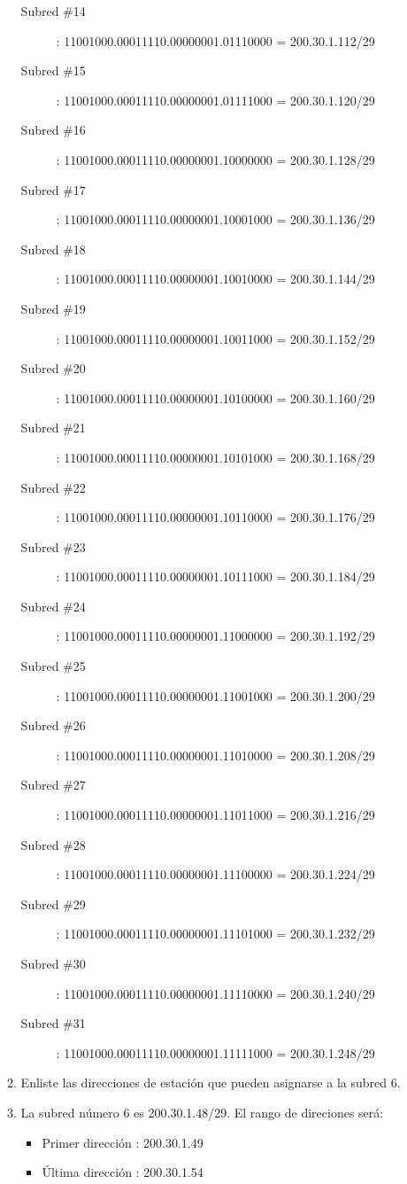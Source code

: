 \begin{enumerate}
\begin{enumerate}
\begin{description}
            \item[Subred \#14] : 11001000.00011110.00000001.01110000 = 200.30.1.112/29
            \item[Subred \#15] : 11001000.00011110.00000001.01111000 = 200.30.1.120/29
            \item[Subred \#16] : 11001000.00011110.00000001.10000000 = 200.30.1.128/29
            \item[Subred \#17] : 11001000.00011110.00000001.10001000 = 200.30.1.136/29
            \item[Subred \#18] : 11001000.00011110.00000001.10010000 = 200.30.1.144/29
            \item[Subred \#19] : 11001000.00011110.00000001.10011000 = 200.30.1.152/29
            \item[Subred \#20] : 11001000.00011110.00000001.10100000 = 200.30.1.160/29
            \item[Subred \#21] : 11001000.00011110.00000001.10101000 = 200.30.1.168/29
            \item[Subred \#22] : 11001000.00011110.00000001.10110000 = 200.30.1.176/29
            \item[Subred \#23] : 11001000.00011110.00000001.10111000 = 200.30.1.184/29
            \item[Subred \#24] : 11001000.00011110.00000001.11000000 = 200.30.1.192/29
            \item[Subred \#25] : 11001000.00011110.00000001.11001000 = 200.30.1.200/29
            \item[Subred \#26] : 11001000.00011110.00000001.11010000 = 200.30.1.208/29
            \item[Subred \#27] : 11001000.00011110.00000001.11011000 = 200.30.1.216/29
            \item[Subred \#28] : 11001000.00011110.00000001.11100000 = 200.30.1.224/29
            \item[Subred \#29] : 11001000.00011110.00000001.11101000 = 200.30.1.232/29
            \item[Subred \#30] : 11001000.00011110.00000001.11110000 = 200.30.1.240/29
            \item[Subred \#31] : 11001000.00011110.00000001.11111000 = 200.30.1.248/29
        \end{description}

        \item Enliste las direcciones de estaci\'on que pueden asignarse a la subred 6.
        \item[] La subred n\'umero 6 es 200.30.1.48/29. El rango de direciones ser\'a:
        \begin{itemize}
            \item Primer direcci\'on : 200.30.1.49
            \item \'Ultima direcci\'on : 200.30.1.54
        \end{itemize}


\end{enumerate}
\end{enumerate}
